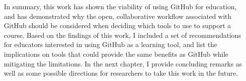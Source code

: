 In summary, this work has shown the viability of using GitHub for education, and has demonstrated why the open, collaborative workflow associated with GitHub should be considered when deciding which tools to use to support a course. Based on the findings of this work, I included a set of recommendations for educators interested in using GitHub as a learning tool, and list the implications on tools that could provide the same benefits as GitHub while mitigating the limitations. In the next chapter, I provide concluding remarks as well as some possible directions for researchers to take this work in the future.


